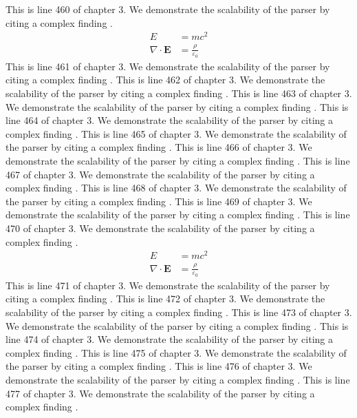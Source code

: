 This is line 460 of chapter 3. We demonstrate the scalability of the parser by citing a complex finding \cite{ref3_460}.
\begin{align*}
  E &= mc^2 \\
  \nabla \cdot \mathbf{E} &= \frac{\rho}{\varepsilon_0}
\end{align*}
This is line 461 of chapter 3. We demonstrate the scalability of the parser by citing a complex finding \cite{ref3_461}.
This is line 462 of chapter 3. We demonstrate the scalability of the parser by citing a complex finding \cite{ref3_462}.
This is line 463 of chapter 3. We demonstrate the scalability of the parser by citing a complex finding \cite{ref3_463}.
This is line 464 of chapter 3. We demonstrate the scalability of the parser by citing a complex finding \cite{ref3_464}.
This is line 465 of chapter 3. We demonstrate the scalability of the parser by citing a complex finding \cite{ref3_465}.
This is line 466 of chapter 3. We demonstrate the scalability of the parser by citing a complex finding \cite{ref3_466}.
This is line 467 of chapter 3. We demonstrate the scalability of the parser by citing a complex finding \cite{ref3_467}.
This is line 468 of chapter 3. We demonstrate the scalability of the parser by citing a complex finding \cite{ref3_468}.
This is line 469 of chapter 3. We demonstrate the scalability of the parser by citing a complex finding \cite{ref3_469}.
This is line 470 of chapter 3. We demonstrate the scalability of the parser by citing a complex finding \cite{ref3_470}.
\begin{align*}
  E &= mc^2 \\
  \nabla \cdot \mathbf{E} &= \frac{\rho}{\varepsilon_0}
\end{align*}
This is line 471 of chapter 3. We demonstrate the scalability of the parser by citing a complex finding \cite{ref3_471}.
This is line 472 of chapter 3. We demonstrate the scalability of the parser by citing a complex finding \cite{ref3_472}.
This is line 473 of chapter 3. We demonstrate the scalability of the parser by citing a complex finding \cite{ref3_473}.
This is line 474 of chapter 3. We demonstrate the scalability of the parser by citing a complex finding \cite{ref3_474}.
This is line 475 of chapter 3. We demonstrate the scalability of the parser by citing a complex finding \cite{ref3_475}.
This is line 476 of chapter 3. We demonstrate the scalability of the parser by citing a complex finding \cite{ref3_476}.
This is line 477 of chapter 3. We demonstrate the scalability of the parser by citing a complex finding \cite{ref3_477}.
